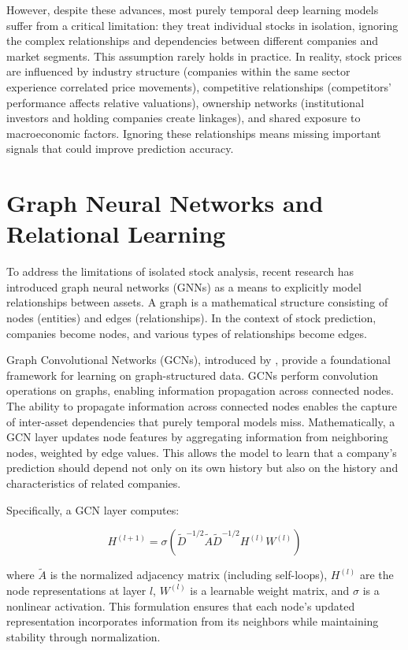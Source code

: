 However, despite these advances, most purely temporal deep learning models suffer from a critical limitation: they treat individual stocks in isolation, ignoring the complex relationships and dependencies between different companies and market segments. This assumption rarely holds in practice. In reality, stock prices are influenced by industry structure (companies within the same sector experience correlated price movements), competitive relationships (competitors' performance affects relative valuations), ownership networks (institutional investors and holding companies create linkages), and shared exposure to macroeconomic factors. Ignoring these relationships means missing important signals that could improve prediction accuracy.

\section{Graph Neural Networks and Relational Learning}

To address the limitations of isolated stock analysis, recent research has introduced graph neural networks (GNNs) as a means to explicitly model relationships between assets. A graph is a mathematical structure consisting of nodes (entities) and edges (relationships). In the context of stock prediction, companies become nodes, and various types of relationships become edges.

Graph Convolutional Networks (GCNs), introduced by \cite{kipf2017semisupervisedclassificationgraphconvolutional}, provide a foundational framework for learning on graph-structured data. GCNs perform convolution operations on graphs, enabling information propagation across connected nodes. The ability to propagate information across connected nodes enables the capture of inter-asset dependencies that purely temporal models miss. Mathematically, a GCN layer updates node features by aggregating information from neighboring nodes, weighted by edge values. This allows the model to learn that a company's prediction should depend not only on its own history but also on the history and characteristics of related companies.

Specifically, a GCN layer computes:

$$H^{(l+1)} = \sigma(\tilde{D}^{-1/2}\tilde{A}\tilde{D}^{-1/2}H^{(l)}W^{(l)})$$

where $\tilde{A}$ is the normalized adjacency matrix (including self-loops), $H^{(l)}$ are the node representations at layer $l$, $W^{(l)}$ is a learnable weight matrix, and $\sigma$ is a nonlinear activation. This formulation ensures that each node's updated representation incorporates information from its neighbors while maintaining stability through normalization.

